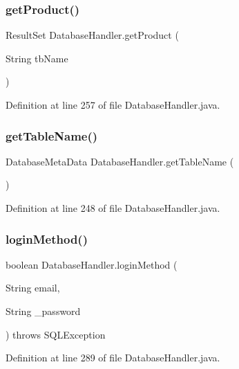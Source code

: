 \subsubsection{\texorpdfstring{getProduct()}{getProduct()}}
{\footnotesize\ttfamily Result\+Set Database\+Handler.\+get\+Product (\begin{DoxyParamCaption}\item[{String}]{tb\+Name }\end{DoxyParamCaption})}



Definition at line 257 of file Database\+Handler.\+java.

\mbox{\label{class_database_handler_aee7ff1913c7d5cf9453b9eca5e80648d}} 
\subsubsection{\texorpdfstring{getTableName()}{getTableName()}}
{\footnotesize\ttfamily Database\+Meta\+Data Database\+Handler.\+get\+Table\+Name (\begin{DoxyParamCaption}{ }\end{DoxyParamCaption})}



Definition at line 248 of file Database\+Handler.\+java.

\mbox{\label{class_database_handler_abedcbb21da30f991f7b93b1db5c9b829}} 
\subsubsection{\texorpdfstring{loginMethod()}{loginMethod()}}
{\footnotesize\ttfamily boolean Database\+Handler.\+login\+Method (\begin{DoxyParamCaption}\item[{String}]{email,  }\item[{String}]{\+\_\+password }\end{DoxyParamCaption}) throws S\+Q\+L\+Exception}



Definition at line 289 of file Database\+Handler.\+java.

